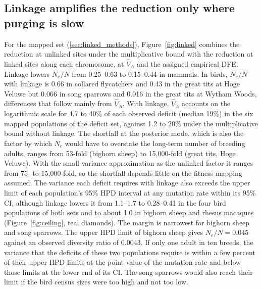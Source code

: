 \documentclass{article}
\begin{document}
\subsection{Linkage amplifies the reduction only where purging is slow}\label{sec:res_linked}
For the mapped set (\autoref{sec:linked_methods}), Figure~\ref{fig:linked} combines the reduction at unlinked sites under the multiplicative bound with the reduction at linked sites along each chromosome, at $\hat{V}_A$ and the assigned empirical DFE. Linkage lowers $N_e/N$ from 0.25--0.63 to 0.15--0.44 in mammals. In birds, $N_e/N$ with linkage is 0.66 in collared flycatchers and 0.43 in the great tits at Hoge Veluwe but 0.066 in song sparrows and 0.016 in the great tits at Wytham Woods, differences that follow mainly from $\hat{V}_A$. With linkage, $\hat{V}_A$ accounts on the logarithmic scale for 4.7 to 40\% of each observed deficit (median 19\%) in the six mapped populations of the deficit set, against 1.2 to 20\% under the multiplicative bound without linkage. The shortfall at the posterior mode, which is also the factor by which $N_c$ would have to overstate the long-term number of breeding adults, ranges from 53-fold (bighorn sheep) to 15,000-fold (great tits, Hoge Veluwe). With the small-variance approximation as the unlinked factor it ranges from 75- to 15,000-fold, so the shortfall depends little on the fitness mapping assumed. The variance each deficit requires with linkage also exceeds the upper limit of each population's 95\% HPD interval at any mutation rate within its 95\% CI, although linkage lowers it from 1.1--1.7 to 0.28--0.41 in the four bird populations of both sets and to about 1.0 in bighorn sheep and rhesus macaques (Figure~\ref{fig:ceiling}, teal diamonds). The margin is narrowest for bighorn sheep and song sparrows. The upper HPD limit of bighorn sheep gives $N_e/N = 0.045$ against an observed diversity ratio of 0.0043. If only one adult in ten breeds, the variance that the deficits of these two populations require is within a few percent of their upper HPD limits at the point value of the mutation rate and below those limits at the lower end of its CI. The song sparrows would also reach their limit if the bird census sizes were too high and not too low.
\end{document}
